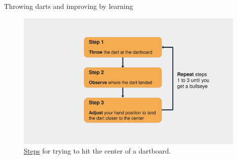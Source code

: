 \documentclass{beamer}
\begin{document}
\begin{frame}{Throwing darts and improving by learning}
    \begin{figure}
        \includegraphics[width=0.9\linewidth]{TrainingDart}
        \caption{\href{https://realpython.com/python-ai-neural-network/}{Steps} for trying to hit the center of a dartboard.}
        \label{Fig:TrainingDart}
    \end{figure}
\end{frame}
\end{document}

